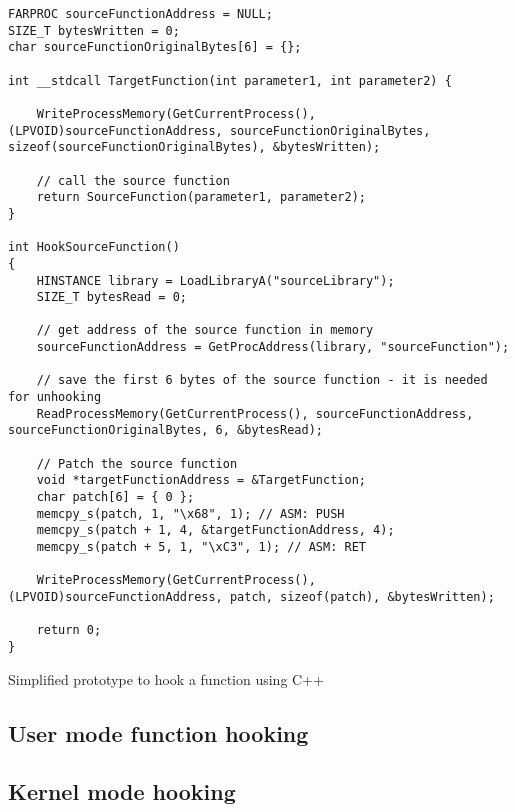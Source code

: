 \documentclass{report}
\begin{document}
\begin{listing}[H]
\begin{verbatim}
FARPROC sourceFunctionAddress = NULL;
SIZE_T bytesWritten = 0;
char sourceFunctionOriginalBytes[6] = {};

int __stdcall TargetFunction(int parameter1, int parameter2) {
	
	WriteProcessMemory(GetCurrentProcess(), (LPVOID)sourceFunctionAddress, sourceFunctionOriginalBytes, sizeof(sourceFunctionOriginalBytes), &bytesWritten);
	
	// call the source function
	return SourceFunction(parameter1, parameter2);
}

int HookSourceFunction()
{
	HINSTANCE library = LoadLibraryA("sourceLibrary");
	SIZE_T bytesRead = 0;
	
	// get address of the source function in memory
	sourceFunctionAddress = GetProcAddress(library, "sourceFunction");

	// save the first 6 bytes of the source function - it is needed for unhooking
	ReadProcessMemory(GetCurrentProcess(), sourceFunctionAddress, sourceFunctionOriginalBytes, 6, &bytesRead);
	
    // Patch the source function
	void *targetFunctionAddress = &TargetFunction;
	char patch[6] = { 0 };
	memcpy_s(patch, 1, "\x68", 1); // ASM: PUSH
	memcpy_s(patch + 1, 4, &targetFunctionAddress, 4);
	memcpy_s(patch + 5, 1, "\xC3", 1); // ASM: RET

	WriteProcessMemory(GetCurrentProcess(), (LPVOID)sourceFunctionAddress, patch, sizeof(patch), &bytesWritten);

	return 0;
}
\end{verbatim}
\caption{Simplified prototype to hook a function using C++}
\label{listing:c:hooking-prototype}
\end{listing}



\subsection{User mode function hooking}

\subsection{Kernel mode hooking}

\end{document}
